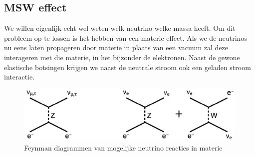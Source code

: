 \documentclass[../main.tex]{subfiles}
\begin{document}
\subsection{MSW effect}%
\label{sub:msw_effect}

We willen eigenlijk echt wel weten welk neutrino welke massa heeft. Om dit probleem op te lossen is het hebben van een materie effect. Als we de neutrinos nu eens laten propageren door materie in plaats van een vacuum zal deze interageren met die materie, in het bijzonder de elektronen. Naast de gewone elastische botsingen krijgen we naast de neutrale stroom ook een geladen stroom interactie.

\begin{figure}[h]
    \centering
    \includegraphics[width=0.7\linewidth]{neutrinos/msw_effect_diagrammen.png}
    \caption{Feynman diagrammen van mogelijke neutrino reacties in materie}%
    \label{fig:neutrinos/msw_effect_diagrammen}
\end{figure}
\end{document}

